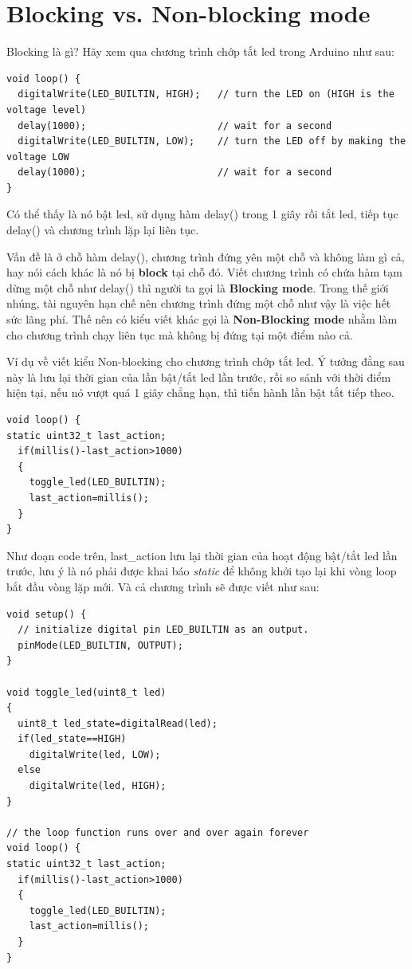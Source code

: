 \section{Blocking vs. Non-blocking mode}

Blocking là gì? Hãy xem qua chương trình chớp tắt led trong Arduino như sau:
\begin{lstlisting}
void loop() {
  digitalWrite(LED_BUILTIN, HIGH);   // turn the LED on (HIGH is the voltage level)
  delay(1000);                       // wait for a second
  digitalWrite(LED_BUILTIN, LOW);    // turn the LED off by making the voltage LOW
  delay(1000);                       // wait for a second
}
\end{lstlisting}

Có thể thấy là nó bật led, sử dụng hàm delay() trong 1 giây rồi tắt led, tiếp tục delay() và chương trình lặp lại liên tục.

Vấn đề là ở chỗ hàm delay(), chương trình đứng yên một chỗ và không làm gì cả, hay nói cách khác là nó bị \textbf{block} tại chỗ đó. Viết chương trình có chứa hàm tạm dừng một chỗ như delay() thì người ta gọi là \textbf{Blocking mode}. Trong thế giới nhúng, tài nguyên hạn chế nên chương trình đứng một chỗ như vậy là việc hết sức lãng phí. Thế nên có kiểu viết khác gọi là \textbf{Non-Blocking mode} nhằm làm cho chương trình chạy liên tục mà không bị đứng tại một điểm nào cả.

Ví dụ về viết kiểu Non-blocking cho chương trình chớp tắt led. Ý tưởng đằng sau này là lưu lại thời gian của lần bật/tắt led lần trước, rồi so sánh với thời điểm hiện tại, nếu nó vượt quá 1 giây chẳng hạn, thì tiến hành lần bật tắt tiếp theo.
\begin{lstlisting}
void loop() {
static uint32_t last_action;
  if(millis()-last_action>1000)
  {
    toggle_led(LED_BUILTIN);
    last_action=millis();
  }
}
\end{lstlisting}

Như đoạn code trên, last\_action lưu lại thời gian của hoạt động bật/tắt led lần trước, lưu ý là nó phải được khai báo \textit{static} để không khởi tạo lại khi vòng loop bắt đầu vòng lặp mới. Và cả chương trình sẽ được viết như sau: 
\begin{lstlisting}
void setup() {
  // initialize digital pin LED_BUILTIN as an output.
  pinMode(LED_BUILTIN, OUTPUT);
}

void toggle_led(uint8_t led)
{
  uint8_t led_state=digitalRead(led);
  if(led_state==HIGH)
    digitalWrite(led, LOW);
  else
    digitalWrite(led, HIGH);
}

// the loop function runs over and over again forever
void loop() {
static uint32_t last_action;
  if(millis()-last_action>1000)
  {
    toggle_led(LED_BUILTIN);
    last_action=millis();
  }
}
\end{lstlisting}

